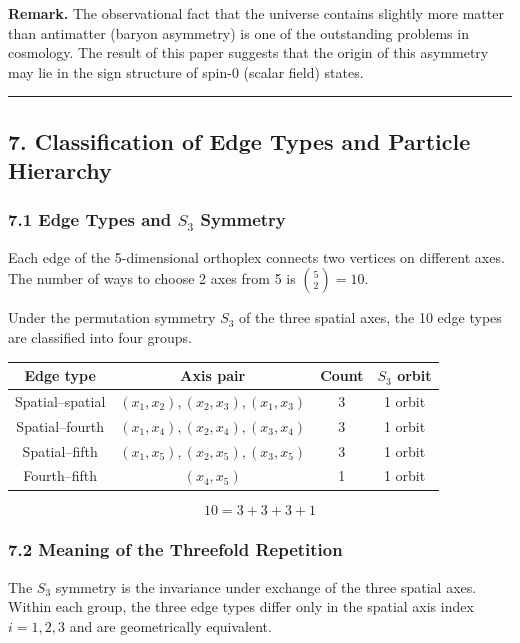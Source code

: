 \documentclass[a4paper,11pt]{article}
\newcounter{none}
\begin{document}
\textbf{Remark.} The observational fact that the universe contains slightly more matter than antimatter (baryon asymmetry) is one of the outstanding problems in cosmology. The result of this paper suggests that the origin of this asymmetry may lie in the sign structure of spin-0 (scalar field) states.

\begin{center}\rule{0.5\linewidth}{0.5pt}\end{center}

\subsection*{7. Classification of Edge Types and Particle Hierarchy}

\subsubsection*{7.1 Edge Types and $S_3$ Symmetry}

Each edge of the 5-dimensional orthoplex connects two vertices on different axes. The number of ways to choose 2 axes from 5 is $\binom{5}{2} = 10$.

Under the permutation symmetry $S_3$ of the three spatial axes, the 10 edge types are classified into four groups.

{\def\LTcaptype{none}
\begin{longtable}[]{@{}cccc@{}}
\toprule
Edge type & Axis pair & Count & $S_3$ orbit \\
\midrule
\endhead
\bottomrule
\endlastfoot
Spatial--spatial & $(x_1, x_2), (x_2, x_3), (x_1, x_3)$ & 3 & 1 orbit \\
Spatial--fourth & $(x_1, x_4), (x_2, x_4), (x_3, x_4)$ & 3 & 1 orbit \\
Spatial--fifth & $(x_1, x_5), (x_2, x_5), (x_3, x_5)$ & 3 & 1 orbit \\
Fourth--fifth & $(x_4, x_5)$ & 1 & 1 orbit \\
\end{longtable}
}

\[10 = 3 + 3 + 3 + 1\]

\subsubsection*{7.2 Meaning of the Threefold Repetition}

The $S_3$ symmetry is the invariance under exchange of the three spatial axes. Within each group, the three edge types differ only in the spatial axis index $i = 1, 2, 3$ and are geometrically equivalent.
\end{document}
